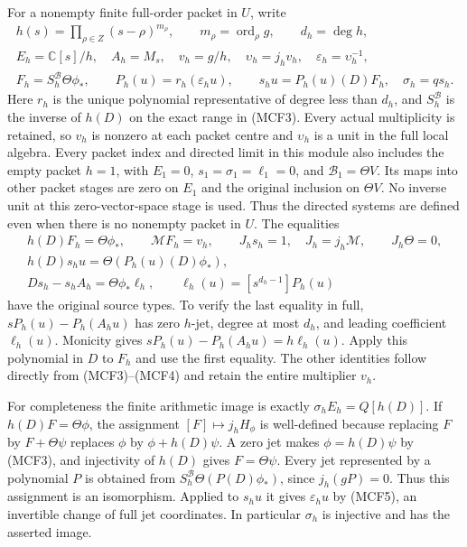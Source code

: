 For a nonempty finite full-order packet in $U$, write
\[
\begin{gathered}
h(s)=\prod_{\rho\in Z}(s-\rho)^{m_\rho},\qquad
m_\rho=\operatorname{ord}_\rho g,\qquad d_h=\deg h,\\
E_h=\mathbb C[s]/h,\quad A_h=M_s,\quad v_h=g/h,\quad
\upsilon_h=j_hv_h,\quad\varepsilon_h=\upsilon_h^{-1},\\
F_h=S_h^{\mathscr B}\Theta\phi_*,\qquad
P_h(u)=r_h(\varepsilon_hu),\qquad
s_hu=P_h(u)(D)F_h,\quad \sigma_h=qs_h.
\end{gathered}
\tag{MCF4}
\]
Here $r_h$ is the unique polynomial representative of degree less than
$d_h$, and $S_h^{\mathscr B}$ is the inverse of $h(D)$ on the exact range
in (MCF3).  Every actual multiplicity is retained, so $v_h$ is nonzero
at each packet centre and $\upsilon_h$ is a unit in the full local algebra.
Every packet index and directed limit in this module also includes the
empty packet $h=1$, with $E_1=0$, $s_1=\sigma_1=\ell_1=0$, and
$\mathscr B_1=\Theta V$.  Its maps into other packet stages are zero
on $E_1$ and the original inclusion on $\Theta V$.  No inverse unit
at this zero-vector-space stage is used.  Thus the directed systems
are defined even when there is no nonempty packet in $U$.
The equalities
\[
\begin{gathered}
h(D)F_h=\Theta\phi_*,\qquad \mathcal MF_h=v_h,\qquad
J_hs_h=1,\quad J_h=j_h\mathcal M,\qquad J_h\Theta=0,\\
h(D)s_hu=\Theta(P_h(u)(D)\phi_*),\\
Ds_h-s_hA_h=\Theta\phi_*\ell_h,\qquad
\ell_h(u)=[s^{d_h-1}]P_h(u)
\end{gathered}
\tag{MCF5}
\]
have the original source types.  To verify the last equality in full,
$sP_h(u)-P_h(A_hu)$ has zero $h$-jet, degree at most $d_h$, and leading
coefficient $\ell_h(u)$.  Monicity gives
$sP_h(u)-P_h(A_hu)=h\ell_h(u)$.  Apply this polynomial in $D$ to $F_h$
and use the first equality.  The other identities follow directly from
(MCF3)--(MCF4) and retain the entire multiplier $v_h$.

For completeness the finite arithmetic image is exactly
$\sigma_hE_h=Q[h(D)]$.  If $h(D)F=\Theta\phi$, the assignment
$[F]\mapsto j_hH_\phi$ is well-defined because replacing $F$ by
$F+\Theta\psi$ replaces $\phi$ by $\phi+h(D)\psi$.  A zero jet makes
$\phi=h(D)\psi$ by (MCF3), and injectivity of $h(D)$ gives
$F=\Theta\psi$.  Every jet represented by a polynomial $P$ is obtained
from $S_h^{\mathscr B}\Theta(P(D)\phi_*)$, since $j_h(gP)=0$.
Thus this assignment is an isomorphism.  Applied to $s_hu$ it gives
$\varepsilon_hu$ by (MCF5), an invertible change of full jet coordinates.
In particular $\sigma_h$ is injective and has the asserted image.

